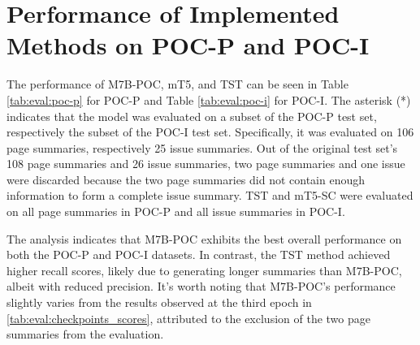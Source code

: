 \documentclass[english, ba, kiv, he, iso690numb, pdf, viewonly]{fasthesis}
\begin{document}
\section{Performance of Implemented Methods on POC-P and POC-I}\label{eval:res_poc}
The performance of M7B-POC, mT5, and TST can be seen in Table \ref{tab:eval:poc-p} for POC-P and Table \ref{tab:eval:poc-i} for POC-I. The asterisk (*) indicates that the model was evaluated on a subset of the POC-P test set, respectively the subset of the POC-I test set. Specifically, it was evaluated on 106 page summaries, respectively 25 issue summaries. Out of the original test set's 108 page summaries and 26 issue summaries, two page summaries and one issue were discarded because the two page summaries did not contain enough information to form a complete issue summary. TST and mT5-SC were evaluated on all page summaries in POC-P and all issue summaries in POC-I.

The analysis indicates that M7B-POC exhibits the best overall performance on both the POC-P and POC-I datasets. In contrast, the TST method achieved higher recall scores, likely due to generating longer summaries than M7B-POC, albeit with reduced precision. It's worth noting that M7B-POC's performance slightly varies from the results observed at the third epoch in \ref{tab:eval:checkpoints_scores}, attributed to the exclusion of the two page summaries from the evaluation.
\end{document}
